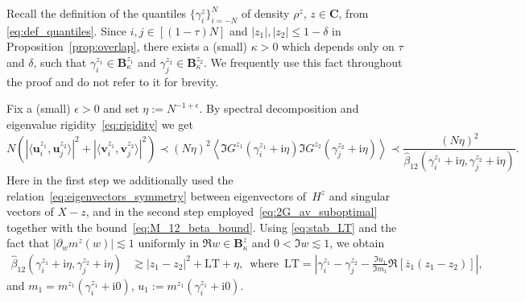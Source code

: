 \documentclass[10pt]{amsart}
\numberwithin{equation}{section}
\newcommand{\C}{\mathbf{C}}
\newcommand{\ii}{\mathrm{i}}
\begin{document}
Recall the definition of the quantiles $\{\gamma_i^z\}_{i=-N}^N$ of density $\rho^z$, $z\in\C$, from \eqref{eq:def_quantiles}. Since $i,j\in [(1-\tau)N]$ and $|z_1|,|z_2|\le 1-\delta$ in Proposition~\ref{prop:overlap}, there exists a (small) $\kappa>0$ which depends only on $\tau$ and $\delta$, such that $\gamma_i^{z_1}\in\mathbf{B}^{z_1}_\kappa$ and $\gamma_j^{z_2}\in\mathbf{B}^{z_2}_\kappa$. We frequently use this fact throughout the proof and do not refer to it for brevity.

Fix a (small) $\epsilon>0$ and set $\eta:=N^{-1+\epsilon}$. By spectral decomposition and eigenvalue rigidity~\eqref{eq:rigidity} we get
\begin{equation}
N\!\left(\left\vert \langle \bm{u}_i^{z_1},\bm{u}_j^{z_2}\rangle\right\vert^2 + \left\vert \langle \bm{v}_i^{z_1},\bm{v}_j^{z_2}\rangle\right\vert^2\right)\!\!\prec\! (N\eta)^2 \left\langle \Im G^{z_1}(\gamma_i^{z_1}+\ii\eta)\Im G^{z_2}(\gamma_j^{z_2}+\ii\eta) \right\rangle\!\!\prec\! \frac{(N\eta)^2}{\widehat{\beta}_{12}(\gamma_i^{z_1}+\ii\eta,\gamma_j^{z_2}+\ii\eta)}.
\label{eq:overlap_proof} 
\end{equation} 
Here in the first step we additionally used the relation~\eqref{eq:eigenvectors_symmetry} between eigenvectors of~$H^z$ and singular vectors of $X-z$, and in the second step employed~\eqref{eq:2G_av_suboptimal} together with the bound~\eqref{eq:M_12_beta_bound}. Using \eqref{eq:stab_LT} and the fact that $|\partial_w m^z(w)|\lesssim 1$ uniformly in $\Re w\in\mathbf{B}_\kappa^z$ and $0<\Im w\lesssim 1$, we obtain 
\begin{equation}
\begin{split}
\widehat{\beta}_{12}(\gamma_i^{z_1}+\ii\eta,\gamma_j^{z_2}+\ii\eta)&\gtrsim |z_1-z_2|^2 + \mathrm{LT}+\eta,\,\,\,\text{where}\,\,\,\mathrm{LT}=\left\vert \gamma_i^{z_1}-\gamma_j^{z_2} - \frac{\Im u_1}{\Im m_1}\Re \left[\overline{z}_1(z_1-z_2)\right]\right\vert,
\end{split}
\label{eq:beta_quant}
\end{equation}
and $m_1=m^{z_1}(\gamma^{z_1}_i+\ii 0)$, $u_1:=m^{z_1}(\gamma^{z_1}_i+\ii 0)$.
\end{document}
